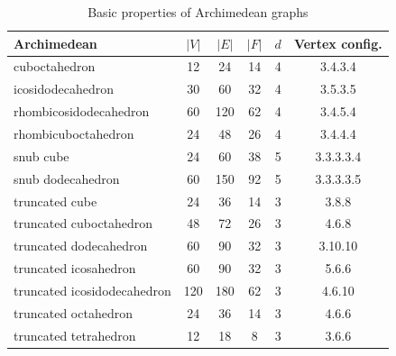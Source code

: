 \begin{table}[H]
\centering
\begin{tabular}{l@{\hspace{1.5cm}}ccccc}
\toprule
\textbf{Archimedean} & \textbf{$|V|$} & \textbf{$|E|$} & \textbf{$|F|$} & \textbf{$d$} & \textbf{Vertex config.} \\
\midrule
cuboctahedron & 12 & 24 & 14 & 4 & 3.4.3.4 \\
icosidodecahedron & 30 & 60 & 32 & 4 & 3.5.3.5 \\
rhombicosidodecahedron & 60 & 120 & 62 & 4 & 3.4.5.4 \\
rhombicuboctahedron & 24 & 48 & 26 & 4 & 3.4.4.4 \\
snub cube & 24 & 60 & 38 & 5 & 3.3.3.3.4 \\
snub dodecahedron & 60 & 150 & 92 & 5 & 3.3.3.3.5 \\
truncated cube & 24 & 36 & 14 & 3 & 3.8.8 \\
truncated cuboctahedron & 48 & 72 & 26 & 3 & 4.6.8 \\
truncated dodecahedron & 60 & 90 & 32 & 3 & 3.10.10 \\
truncated icosahedron & 60 & 90 & 32 & 3 & 5.6.6 \\
truncated icosidodecahedron & 120 & 180 & 62 & 3 & 4.6.10 \\
truncated octahedron & 24 & 36 & 14 & 3 & 4.6.6 \\
truncated tetrahedron & 12 & 18 & 8 & 3 & 3.6.6 \\
\bottomrule
\end{tabular}
\caption{Basic properties of Archimedean graphs}
\label{tab:archimedean-basic-props}
\end{table}

